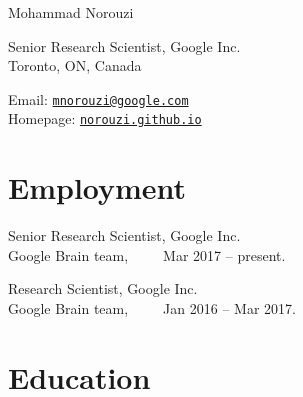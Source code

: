 \documentclass[10pt,letterpaper]{article}
\def\name{Mohammad Norouzi}
\renewenvironment{itemize}{
  \begin{list}{}{
    \setlength{\leftmargin}{1.5em}
  }
}{
  \end{list}
}
\begin{document}
{\huge \name}


\vspace{0.25in}

\begin{minipage}[t]{0.5\textwidth}
  Senior Research Scientist, Google Inc.\\
  Toronto, ON, Canada
\end{minipage}
\begin{minipage}[t]{0.5\textwidth}
  Email: \href{mailto:mnorouzi@google.com}{\tt mnorouzi@google.com} \\
  Homepage: \href{https://norouzi.github.io/}{\tt norouzi.github.io} \\
\end{minipage}

\section*{Employment}

\begin{itemize}
  \item Senior Research Scientist, Google Inc.\\
    Google Brain team,~~~~~Mar 2017 -- present.
  \item Research Scientist, Google Inc.\\
    Google Brain team,~~~~~Jan 2016 -- Mar 2017.
\end{itemize}

\section*{Education}
\end{document}
